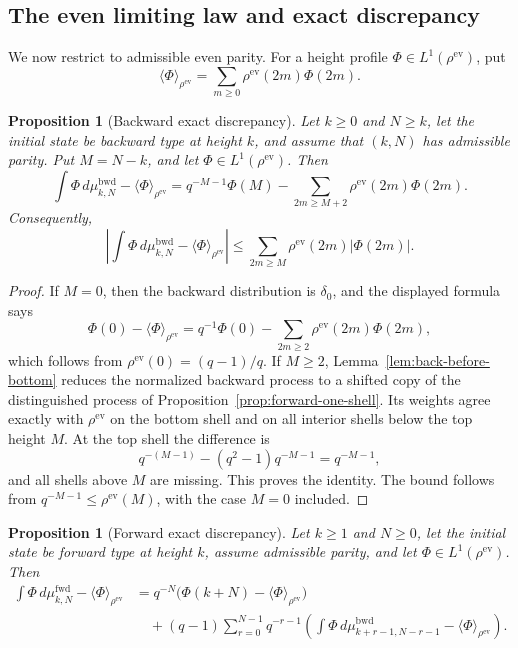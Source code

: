 \documentclass[11pt]{amsart}
\theoremstyle{definition}
\theoremstyle{plain}
\newtheorem{proposition}[definition]{Proposition}
\newcommand{\fwd}{\mathrm{fwd}}
\newcommand{\bwd}{\mathrm{bwd}}
\newcommand{\ev}{\mathrm{ev}}
\newcommand{\ang}{\langle}
\newcommand{\rang}{\rangle}
\begin{document}
\subsection{The even limiting law and exact discrepancy}
We now restrict to admissible even parity.  For a height profile
\(\Phi\in L^1(\rho^{\ev})\), put
\[
\ang\Phi\rang_{\rho^{\ev}}=\sum_{m\ge0}\rho^{\ev}(2m)\Phi(2m).
\]

\begin{proposition}[Backward exact discrepancy]\label{prop:back-discrepancy}
Let \(k\ge0\) and \(N\ge k\), let the initial state be backward type at height
\(k\), and assume that \((k,N)\) has admissible parity.  Put
\(M=N-k\), and let
\(\Phi\in L^1(\rho^{\ev})\).  Then
\[
\int \Phi\,d\mu^{\bwd}_{k,N}-\ang\Phi\rang_{\rho^{\ev}}
=q^{-M-1}\Phi(M)-\sum_{2m\ge M+2}\rho^{\ev}(2m)\Phi(2m).
\]
Consequently,
\[
\left|\int \Phi\,d\mu^{\bwd}_{k,N}-\ang\Phi\rang_{\rho^{\ev}}\right|
\le \sum_{2m\ge M}\rho^{\ev}(2m)|\Phi(2m)|.
\]
\end{proposition}

\begin{proof}
If \(M=0\), then the backward distribution is \(\delta_0\), and the displayed
formula says
\[
\Phi(0)-\ang\Phi\rang_{\rho^{\ev}}
= q^{-1}\Phi(0)-\sum_{2m\ge2}\rho^{\ev}(2m)\Phi(2m),
\]
which follows from \(\rho^{\ev}(0)=(q-1)/q\).  If \(M\ge2\),
Lemma~\ref{lem:back-before-bottom} reduces the normalized backward process to a
shifted copy of the distinguished process of Proposition~\ref{prop:forward-one-shell}.  Its
weights agree exactly with \(\rho^{\ev}\) on the bottom shell and on all interior
shells below the top height \(M\).  At the top shell the difference is
\[
q^{-(M-1)}-(q^2-1)q^{-M-1}=q^{-M-1},
\]
and all shells above \(M\) are missing.  This proves the identity.  The bound
follows from \(q^{-M-1}\le \rho^{\ev}(M)\), with the case \(M=0\) included.
\end{proof}

\begin{proposition}[Forward exact discrepancy]\label{prop:forward-discrepancy}
Let \(k\ge1\) and \(N\ge0\), let the initial state be forward type at height
\(k\), assume admissible parity, and let \(\Phi\in L^1(\rho^{\ev})\).  Then
\begin{align*}
\int \Phi\,d\mu^{\fwd}_{k,N}-\ang\Phi\rang_{\rho^{\ev}}
&=q^{-N}\bigl(\Phi(k+N)-\ang\Phi\rang_{\rho^{\ev}}\bigr)  \\
&\quad +(q-1)\sum_{r=0}^{N-1}q^{-r-1}
\left(\int \Phi\,d\mu^{\bwd}_{k+r-1,N-r-1}-\ang\Phi\rang_{\rho^{\ev}}\right).
\end{align*}
\end{proposition}
\end{document}
